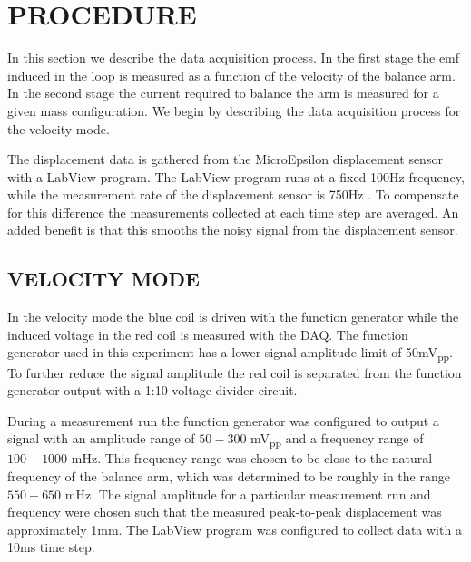 \documentclass[aps,prstab,reprint,12pt]{revtex4-1}
\begin{document}




\section{PROCEDURE}


In this section we describe the data acquisition process. In the first stage the emf induced in the loop is measured as a function of the velocity of the balance arm. In the second stage the current required to balance the arm is measured for a given mass configuration. We begin by describing the data acquisition process for the velocity mode. %

The displacement data is gathered from the MicroEpsilon displacement sensor with a LabView program. The LabView program runs at a fixed 100Hz frequency, while the measurement rate of the displacement sensor is 750Hz \cite{muepsilon_sheet}. To compensate for this difference the measurements collected at each time step are averaged. An added benefit is that this smooths the noisy signal from the displacement sensor.

\subsection{VELOCITY MODE}

In the velocity mode the blue coil is driven with the function generator while the induced voltage in the red coil is measured with the DAQ. The function generator used in this experiment has a lower signal amplitude limit of 50\si{mV_{pp}}. To further reduce the signal amplitude the red coil is separated from the function generator output with a 1:10 voltage divider circuit.

During a measurement run the function generator was configured to output a signal with an amplitude range of $50-300$ \si{mV_{pp}} and a frequency range of $100-1000$ \si{mHz}. This frequency range was chosen to be close to the natural frequency of the balance arm, which was determined to be roughly in the range $550-650$ \si{mHz}. The signal amplitude for a particular measurement run and frequency were chosen such that the measured peak-to-peak displacement was approximately 1\si{mm}. The LabView program was configured to collect data with a 10ms time step.



\end{document}
